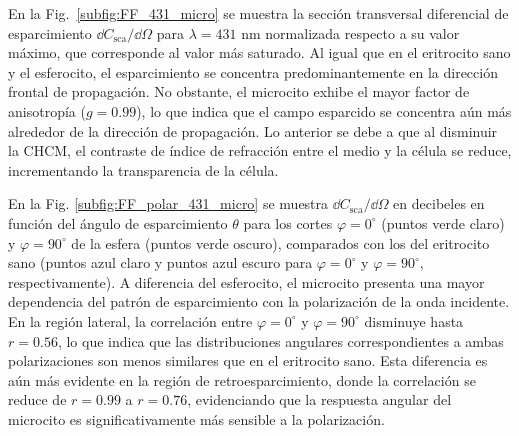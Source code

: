 En la Fig.~\ref{subfig:FF_431_micro} se muestra la sección transversal diferencial de esparcimiento $\dd{C_{\text{sca}}}/\dd{\Omega}$ para $\lambda=431$ nm normalizada respecto a su valor máximo, que corresponde al valor más saturado. Al igual que en el eritrocito sano y el esferocito, el esparcimiento se concentra predominantemente en la dirección frontal de propagación. No obstante, el microcito exhibe el mayor factor de anisotropía ($g=0.99$), lo que indica que el campo esparcido se concentra aún más alrededor de la dirección de propagación. Lo anterior se debe a que al disminuir la CHCM, el contraste de índice de refracción entre el medio y la célula se reduce, incrementando la transparencia de la célula.

En la Fig. \ref{subfig:FF_polar_431_micro} se muestra $\dd{C_{\text{sca}}}/\dd{\Omega}$ en decibeles en función del ángulo de esparcimiento $\theta$ para los cortes $\varphi=0^{\circ}$ (puntos verde claro) y $\varphi=90^{\circ}$ de la esfera (puntos verde oscuro), comparados con los del eritrocito sano (puntos azul claro y puntos azul escuro para $\varphi=0^{\circ}$ y $\varphi=90^{\circ}$, respectivamente). A diferencia del esferocito, el microcito presenta una mayor dependencia del patrón de esparcimiento con la polarización de la onda incidente. En la región lateral, la correlación entre $\varphi=0^{\circ}$  y $\varphi=90^{\circ}$ disminuye hasta $r=0.56$, lo que indica que las distribuciones angulares correspondientes a ambas polarizaciones son menos similares que en el eritrocito sano. Esta diferencia es aún más evidente en la región de retroesparcimiento, donde la correlación se reduce de $r=0.99$ a $r=0.76$, evidenciando que la respuesta angular del microcito es significativamente más sensible a la polarización. 

